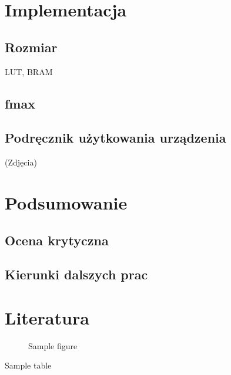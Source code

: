 \documentclass[a4paper]{report}
\begin{document}
\chapter{Implementacja}
	\section{Rozmiar}
	LUT, BRAM
	\section{fmax}
	\section{Podręcznik użytkowania urządzenia}
	(Zdjęcia)
	
\chapter{Podsumowanie}
	\section{Ocena krytyczna}	
	\section{Kierunki dalszych prac}
	
\chapter{Literatura}

\begin{figure}
	\caption{Sample figure}
\end{figure}
		
\begin{table}
	\caption{Sample table}
\end{table}

\begin{appendix}
	\listoffigures
	\listoftables
\end{appendix}
\end{document}

